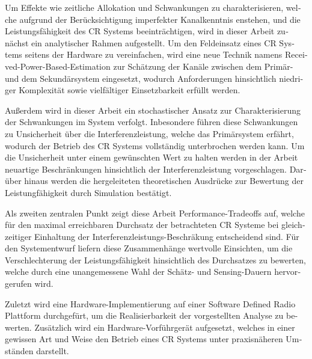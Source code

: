\begin{otherlanguage}{german}
Um Effekte wie zeitliche Allokation und Schwankungen zu charakterisieren, welche aufgrund der Ber\"ucksichtigung imperfekter Kanalkenntnis enstehen, und die Leistungsf\"ahigkeit des CR Systems beeintr\"achtigen, wird in dieser Arbeit zun\"achst ein analytischer Rahmen aufgestellt. Um den Feldeinsatz eines CR Systems seitens der Hardware zu vereinfachen, wird eine neue Technik namens Received-Power-Based-Estimation zur Sch\"atzung der Kan\"ale  zwischen dem Prim\"ar- und dem Sekund\"arsystem eingesetzt, wodurch Anforderungen hinsichtlich niedriger Komplexit\"at sowie vielf\"altiger Einsetzbarkeit erf\"ullt werden. 

Au\ss erdem wird in dieser Arbeit ein stochastischer Ansatz zur Charakterisierung der Schwankungen im System verfolgt. Inbesondere f\"uhren diese Schwankungen zu Unsicherheit \"uber die Interferenzleistung, welche das Prim\"arsystem erf\"ahrt, wodurch der Betrieb des CR Systems vollst\"andig unterbrochen werden kann. Um die Unsicherheit unter einem gew\"unschten Wert zu halten werden in der Arbeit neuartige Beschr\"ankungen hinsichtlich der Interferenzleistung vorgeschlagen. Dar\"uber hinaus werden die hergeleiteten theoretischen Ausdr\"ucke zur Bewertung der Leistungf\"ahigkeit durch Simulation best\"atigt. 

Als zweiten zentralen Punkt zeigt diese Arbeit Performance-Tradeoffs auf, welche f\"ur den maximal erreichbaren Durchsatz der betrachteten CR Systeme bei gleichzeitiger Einhaltung der Interferenzleistungs-Beschr\"akung entscheidend sind. F\"ur den Systementwurf liefern diese Zusammenh\"ange wertvolle Einsichten, um die Verschlechterung der Leistungsf\"ahigkeit hinsichtlich des Durchsatzes zu bewerten, welche durch eine unangemessene Wahl der Sch\"atz- und Sensing-Dauern hervorgerufen wird.

Zuletzt wird eine Hardware-Implementierung auf einer Software Defined Radio Plattform durchgef\"urt, um die Realisierbarkeit der vorgestellten Analyse zu bewerten. Zus\"atzlich wird ein Hardware-Vorf\"uhrger\"at aufgesetzt, welches in einer gewissen Art und Weise den Betrieb eines CR Systems unter praxisn\"aheren Umst\"anden darstellt.
\end{otherlanguage}
\cleardoublepage

